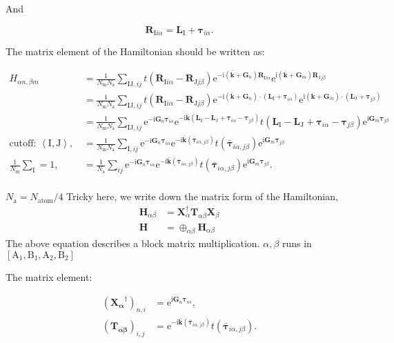 \documentclass[%
 amsmath,amssymb,
rmp,
]{revtex4-1}
\def \bkbar {\bar{\mathbf{k}}}
\def \bG    {\mathbf{G}}
\def \e     {\mathrm{e}}
\def \I     {\mathrm{I}}
\def \J     {\mathrm{J}}
\def \i     {\mathrm{i}}
\def \bR    {\mathbf{R}}
\def \bL    {\mathbf{L}}
\def \btau  {\bm{\tau}}
\def \bH    {\mathbf{H}}
\begin{document}
And

\begin{equation}
\bR_{\I i \alpha} = \bL_{\I} + \btau_{i \alpha}.
\end{equation}

The matrix element of the Hamiltonian should be written as:

\begin{equation}
\begin{aligned}
H_{\alpha n, \beta m} &= \frac{1}{N_\mathrm{m} N_\mathrm{a}} \sum_{\I \J,ij} t(\bR_{\I i \alpha}-\bR_{\J j \beta})
\e^{-\i(\bkbar+\bG_n)\bR_{\I i \alpha}} \e^{\i(\bkbar+\bG_m)\bR_{\J j \beta}} \\
&= \frac{1}{N_\mathrm{m} N_\mathrm{a}} \sum_{\I \J,ij} t(\bR_{\I i \alpha}-\bR_{\J j \beta})
\e^{-\i(\bkbar+\bG_n)\cdot(\bL_{\I} +\btau_{i\alpha})} \e^{\i(\bkbar+\bG_m)\cdot(\bL_{\J} +\btau_{j\beta})} \\
&=\frac{1}{N_\mathrm{m} N_\mathrm{a}} \sum_{\I \J,ij} \e^{-\i \bG_n \btau_{i\alpha}} \e^{-\i \bkbar (\bL_\I -\bL_\J+\btau_{i\alpha}-\btau_{j\beta})} 
t(\bL_\I -\bL_\J+\btau_{i\alpha}-\btau_{j\beta}) \e^{\i \bG_m \btau_{j\beta}}\\
\text{cutoff: $\left<\I, \J\right>$,}\,\,&= \frac{1}{N_\mathrm{m} N_\mathrm{a}} \sum_{\I ,ij} \e^{-\i \bG_n \btau_{i\alpha}} \e^{-\i \bkbar (\bar{\btau}_{i\alpha, j\beta})} 
t(\bar{\btau}_{i\alpha, j\beta}) \e^{\i \bG_m \btau_{j\beta}} \\
\text{$\frac{1}{N_{\mathrm{m}}}\sum_{\I} =1$,}\,\,&=\frac{1}{N_\mathrm{a}} \sum_{ij} \e^{-\i \bG_n \btau_{i\alpha}} \e^{-\i \bkbar (\bar{\btau}_{i\alpha, j\beta})} 
t(\bar{\btau}_{i\alpha, j\beta}) \e^{\i \bG_m \btau_{j\beta}}. \\
\end{aligned}
\end{equation}

$N_{\mathrm{a}} = N_{\mathrm{atom}}/4$ Tricky here, we write down the matrix form of the Hamiltonian,
\begin{equation}
\begin{aligned}
\bH_{\alpha\beta} &= \mathbf{X}^\dagger_{\alpha} \mathbf{T}_{\alpha\beta} \mathbf{X}_{\beta} \\
\bH &= \oplus_{\alpha \beta} \bH_{\alpha\beta}
\end{aligned}
\end{equation}
The above equation describes a block matrix multiplication. $\alpha,\beta$ runs in $[\mathrm{A}_1,\mathrm{B}_1, \mathrm{A}_2, \mathrm{B}_2]$

The matrix element:

\begin{equation}
\begin{aligned}
(\mathbf{X_\alpha}^\dagger)_{n,i}  &=\e^{\i\bG_n\btau_{i\alpha}},\\
(\mathbf{T_{\alpha \beta}})_{i, j} &= \e^{-\i \bkbar (\bar{\btau}_{i\alpha, j\beta})} 
t(\bar{\btau}_{i\alpha, j\beta}).
\end{aligned}
\end{equation}
\end{document}
